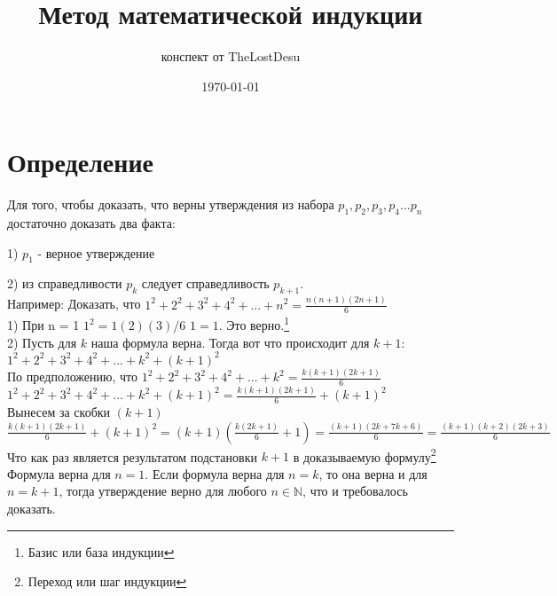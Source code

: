 \documentclass[a4paper,12pt]{article} %
\author{конспект от TheLostDesu}
\title{Метод математической индукции}
\date{\today}
\begin{document}
\maketitle
\section{Определение}
Для того, чтобы доказать, что верны утверждения из набора $p_{1}, p_{2}, p_{3}, p_{4}...p_{n}$
достаточно доказать два факта:

1) $p_{1}$ - верное утверждение

2) из справедливости $p_{k}$ следует справедливость $p_{k+1}$.\\
Например: Доказать, что $1^2+2^2+3^2+4^2+...+n^2=\frac{n(n+1)(2n+1)}{6}$\\
1) При n = 1 \hspace{50pt} $1^2=1(2)(3)/6$ \hspace{50pt} $1=1$. Это верно.\footnote{Базис или база индукции}\\	
2) Пусть для $k$ наша формула верна. Тогда вот что происходит для $k+1$:\\
$1^2+2^2+3^2+4^2+...+k^2+(k+1)^2$\\
По предположению, что $1^2+2^2+3^2+4^2+...+k^2 = \frac{k(k+1)(2k+1)}{6}$\\
$1^2+2^2+3^2+4^2+...+k^2+(k+1)^2=\frac{k(k+1)(2k+1)}{6}+(k+1)^2$\\
Вынесем за скобки $(k+1)$\\
$\frac{k(k+1)(2k+1)}{6}+(k+1)^2=(k+1)(\frac{k(2k + 1)}{6} + 1)=\frac{(k+1)(2k+7k+6)}{6}=\frac{(k+1)(k+2)(2k+3)}{6}$\\
Что как раз является результатом подстановки $k+1$ в доказываемую формулу\footnote{Переход или шаг индукции}\\
Формула верна для $n = 1$. Если формула верна для $n=k$, то она верна и для $n=k+1$, тогда утверждение верно для любого $n\in\mathbb{N}$, что и требовалось доказать.
\end{document}
